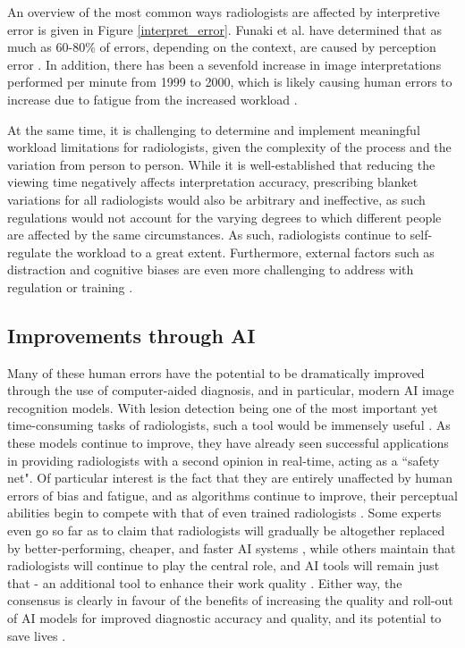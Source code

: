 An overview of the most common ways radiologists are affected by interpretive error is given in Figure \ref{interpret_error}. Funaki et al. have determined that as much as 60-80\% of errors, depending on the context, are caused by perception error \cite{perception_error}. In addition, there has been a sevenfold increase in image interpretations performed per minute from 1999 to 2000, which is likely causing human errors to increase due to fatigue from the increased workload \cite{radiology_error}. 

At the same time, it is challenging to determine and implement meaningful workload limitations for radiologists, given the complexity of the process and the variation from person to person. While it is well-established that reducing the viewing time negatively affects interpretation accuracy, prescribing blanket variations for all radiologists would also be arbitrary and ineffective, as such regulations would not account for the varying degrees to which different people are affected by the same circumstances. As such, radiologists continue to self-regulate the workload to a great extent. Furthermore, external factors such as distraction and cognitive biases are even more challenging to address with regulation or training \cite{workload}. 

\subsection{Improvements through AI}
Many of these human errors have the potential to be dramatically improved through the use of computer-aided diagnosis, and in particular, modern AI image recognition models. With lesion detection being one of the most important yet time-consuming tasks of radiologists, such a tool would be immensely useful \cite{deep_learning_survey}. As these models continue to improve, they have already seen successful applications in providing radiologists with a second opinion in real-time, acting as a ``safety net". Of particular interest is the fact that they are entirely unaffected by human errors of bias and fatigue, and as algorithms continue to improve, their perceptual abilities begin to compete with that of even trained radiologists \cite{workload}. Some experts even go so far as to claim that radiologists will gradually be altogether replaced by better-performing, cheaper, and faster AI systems \cite{ai_foe}, while others maintain that radiologists will continue to play the central role, and AI tools will remain just that - an additional tool to enhance their work quality \cite{doctors_ftw}. Either way, the consensus is clearly in favour of the benefits of increasing the quality and roll-out of AI models for improved diagnostic accuracy and quality, and its potential to save lives \cite{consensus}\cite{ai_adoption}. 

